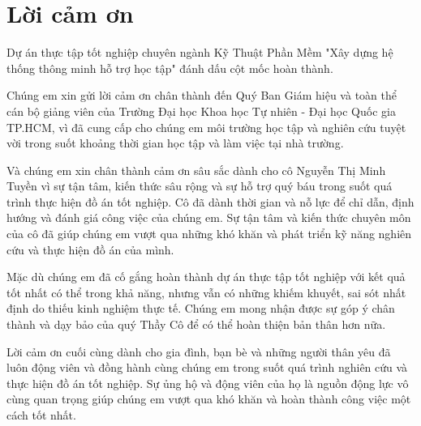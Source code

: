 \chapter*{Lời cảm ơn}
\label{app:thanks}

Dự án thực tập tốt nghiệp chuyên ngành Kỹ Thuật Phần Mềm "Xây dựng hệ thống thông minh hỗ trợ học tập" đánh dấu cột
mốc hoàn thành.

Chúng em xin gửi lời cảm ơn chân thành đến Quý Ban Giám hiệu và toàn thể cán
bộ giảng viên của Trường Đại học Khoa học Tự nhiên - Đại học Quốc gia TP.HCM, vì đã cung cấp cho chúng em môi trường học tập và nghiên cứu tuyệt vời trong suốt khoảng thời gian học tập và làm việc tại nhà trường.

Và chúng em xin chân thành cảm ơn sâu sắc dành cho cô Nguyễn Thị Minh Tuyền vì sự tận tâm, kiến thức sâu rộng và sự hỗ trợ quý báu trong suốt quá trình thực hiện đồ án tốt nghiệp. Cô đã dành thời gian và nỗ lực để chỉ dẫn, định hướng và đánh giá công việc của chúng em. Sự tận tâm và kiến thức chuyên môn của cô đã giúp chúng em vượt qua những khó khăn và phát triển kỹ năng nghiên cứu và thực hiện đồ án của mình.

Mặc dù chúng em đã cố gắng hoàn thành dự án thực tập tốt nghiệp với kết quả tốt nhất có thể trong khả năng, nhưng vẫn có những khiếm khuyết, sai sót nhất định do thiếu kinh nghiệm thực tế. Chúng em mong nhận được sự góp ý chân thành và dạy bảo của quý Thầy Cô để có thể hoàn thiện bản thân hơn nữa.

Lời cảm ơn cuối cùng dành cho gia đình, bạn bè và những người thân yêu đã luôn động viên và đồng hành cùng chúng em trong suốt quá trình nghiên cứu và thực hiện đồ án tốt nghiệp. Sự ủng hộ và động viên của họ là nguồn động lực vô cùng quan trọng giúp chúng em vượt qua khó khăn và hoàn thành công việc một cách tốt nhất.